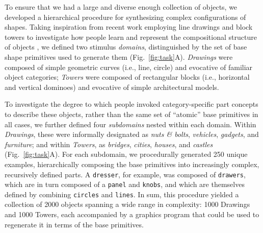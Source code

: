 \documentclass[10pt,letterpaper]{article}
\begin{document}


To ensure that we had a large and diverse enough collection of objects, we developed a hierarchical procedure for synthesizing complex configurations of shapes. 
Taking inspiration from recent work employing line drawings and block towers to investigate how people learn and represent the compositional structure of objects , we defined two stimulus \textit{domains}, distinguished by the set of base shape primitives used to generate them (Fig.~\ref{fig:task}A).
\textit{Drawings} were composed of simple geometric curves (i.e., line, circle) and evocative of familiar object categories; \textit{Towers} were composed of rectangular blocks (i.e., horizontal and vertical dominoes) and evocative of simple architectural models.

To investigate the degree to which people invoked category-specific part concepts to describe these objects, rather than the same set of ``atomic'' base primitives in all cases, we further defined four \textit{subdomains} nested within each domain. 
Within \textit{Drawings}, these were informally designated as \textit{nuts \& bolts}, \textit{vehicles}, \textit{gadgets}, and \textit{furniture}; and within \textit{Towers}, as \textit{bridges}, \textit{cities}, \textit{houses}, and \textit{castles} (Fig.~\ref{fig:task}A).
For each subdomain, we procedurally generated 250 unique examples, hierarchically composing the base primitives into increasingly complex, recursively defined parts. 
A \texttt{dresser}, for example, was composed of \texttt{drawers}, which are in turn composed of a \texttt{panel} and \texttt{knobs}, and which are themselves defined by combining \texttt{circles} and \texttt{lines}.
In sum, this procedure yielded a collection of 2000 objects spanning a wide range in complexity: 1000 Drawings and 1000 Towers, each accompanied by a graphics program that could be used to regenerate it in terms of the base primitives.
\end{document}
